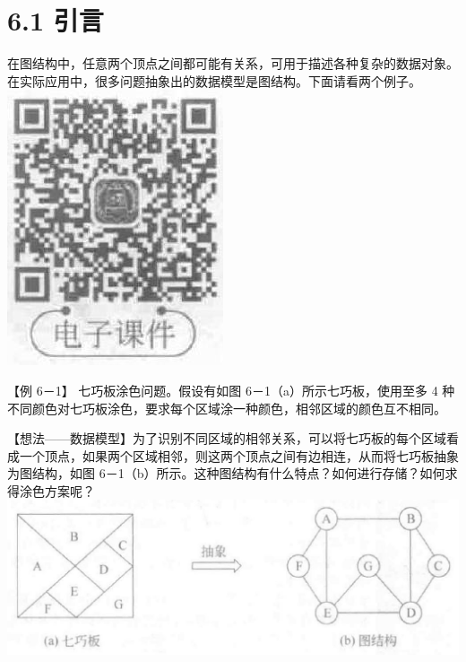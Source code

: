 \documentclass[10pt]{article}
\begin{document}
\section*{6.1 引言}
在图结构中，任意两个顶点之间都可能有关系，可用于描述各种复杂的数据对象。在实际应用中，很多问题抽象出的数据模型是图结构。下面请看两个例子。\\
\includegraphics[max width=\textwidth, center]{2025_06_06_704745ea57b15b2333e5g-185}

【例 6－1】 七巧板涂色问题。假设有如图 6－1（a）所示七巧板，使用至多 4 种不同颜色对七巧板涂色，要求每个区域涂一种颜色，相邻区域的颜色互不相同。

【想法——数据模型】为了识别不同区域的相邻关系，可以将七巧板的每个区域看成一个顶点，如果两个区域相邻，则这两个顶点之间有边相连，从而将七巧板抽象为图结构，如图 6－1（b）所示。这种图结构有什么特点？如何进行存储？如何求得涂色方案呢？\\
\includegraphics[max width=\textwidth, center]{2025_06_06_704745ea57b15b2333e5g-185(1)}
\end{document}
